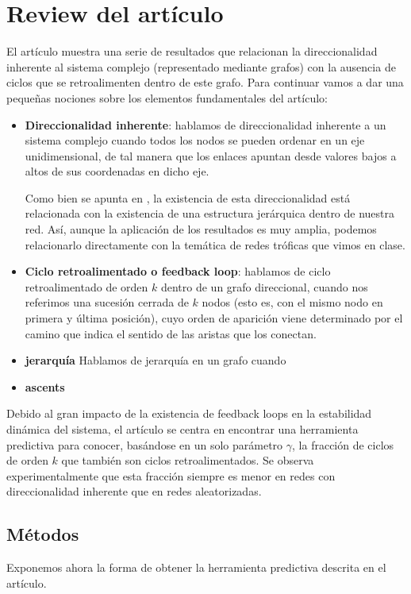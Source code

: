 \documentclass[1p]{elsarticle}
\begin{document}
\section{Review del artículo}
El artículo muestra una serie de resultados que relacionan la direccionalidad inherente al sistema complejo (representado mediante grafos) con la ausencia de ciclos que se retroalimenten dentro de este grafo. 
Para continuar vamos a dar una pequeñas nociones sobre los elementos fundamentales del artículo:
\begin{itemize}
	\item \textbf{Direccionalidad inherente}: hablamos de direccionalidad inherente a un sistema complejo cuando todos los nodos se pueden ordenar en un eje unidimensional, de tal manera que los enlaces apuntan desde valores bajos a altos de sus coordenadas en dicho eje. 
	
	Como bien se apunta en \cite{arti}, la existencia de esta direccionalidad está relacionada con la existencia de una estructura jerárquica dentro de nuestra red. Así, aunque la aplicación de los resultados es muy amplia, podemos relacionarlo directamente con la temática de redes tróficas que vimos en clase. 
	\item \textbf{Ciclo retroalimentado o feedback loop}: hablamos de ciclo retroalimentado de orden $k$ dentro de un grafo direccional, cuando nos referimos una sucesión cerrada de $k$ nodos (esto es, con el mismo nodo en primera y última posición), cuyo orden de aparición viene determinado por el camino que indica el sentido de las aristas que los conectan.
	\item \textbf{jerarquía} Hablamos de jerarquía en un grafo cuando 
	\item \textbf{ascents}
\end{itemize}

Debido al gran impacto de la existencia de feedback loops en la estabilidad dinámica del sistema, el artículo se centra en encontrar una herramienta predictiva para conocer, basándose en un solo parámetro $\gamma$, la fracción de ciclos de orden $k$ que también son ciclos retroalimentados. Se observa experimentalmente que esta fracción siempre es menor en redes con direccionalidad inherente que en redes aleatorizadas.

\subsection{Métodos}
Exponemos ahora la forma de obtener la herramienta predictiva descrita en el artículo.
\end{document}
